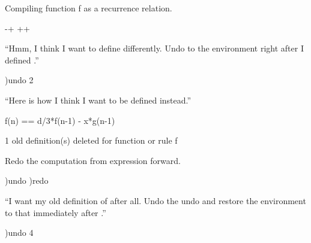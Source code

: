 {{{{{{{{\begin{xtc}
\begin{MessageOutput}
   Compiling function f as a recurrence relation.
\end{MessageOutput}
\begin{TeXOutput}
\begin{fricasmath}{4}
-{}+%
\TIMES {}+\TIMES {}+\TIMES {}%
\end{fricasmath}
\end{TeXOutput}
\end{xtc}
\begin{noOutputXtc}
\begin{xtccomment}
``Hmm, I think I want to define  differently.
Undo to the environment right after I defined .''
\end{xtccomment}
\begin{spadsrc}
)undo 2
\end{spadsrc}
\end{noOutputXtc}
\begin{xtc}
\begin{xtccomment}
``Here is how I think I want  to be defined instead.''
\end{xtccomment}
\begin{spadsrc}
f(n) == d/3*f(n-1) - x*g(n-1)
\end{spadsrc}
\begin{MessageOutput}
   1 old definition(s) deleted for function or rule f 
\end{MessageOutput}
\end{xtc}
\begin{noOutputXtc}
\begin{xtccomment}
Redo the computation from expression  forward.
\end{xtccomment}
\begin{spadsrc}
)undo )redo
\end{spadsrc}
\end{noOutputXtc}
\begin{noOutputXtc}
\begin{xtccomment}
``I want my old definition of
 after all. Undo the undo and restore
the environment to that immediately after .''
\end{xtccomment}
\begin{spadsrc}
)undo 4
\end{spadsrc}

\end{noOutputXtc}}}}}}}}}
